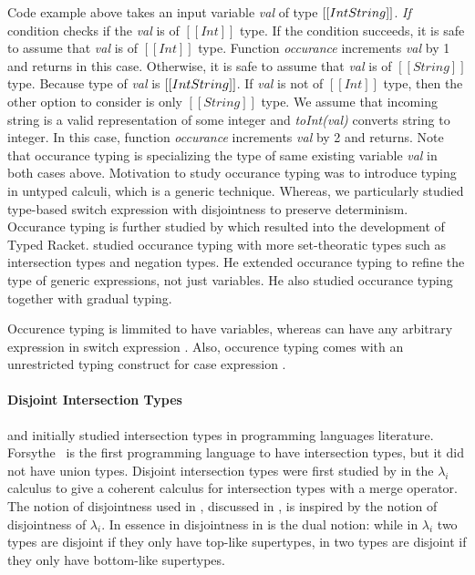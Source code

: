 \noindent Code example above takes an input variable \emph{val}
of type $[[Int \/ String]]$. 
\emph{If} condition checks if the \emph{val} is of $[[Int]]$ type.
If the condition succeeds, it is safe to assume that \emph{val} is of $[[Int]]$ type.
Function \emph{occurance} increments \emph{val} by 1 and returns in this case.
Otherwise, it is safe to assume that \emph{val} is of $[[String]]$ type.
Because type of \emph{val} is $[[Int \/ String]]$. If \emph{val} is not
of $[[Int]]$ type, then the other option to consider is only $[[String]]$ type.
We assume that incoming string is a valid representation of some integer
and \emph{toInt(val)} converts string to integer.
In this case, function \emph{occurance} increments \emph{val} by 2 and returns.
Note that occurance typing is specializing the type of
same existing variable \emph{val} in both cases above.
Motivation to study occurance typing was to introduce typing in untyped calculi,
which is a generic technique.
Whereas, we particularly studied type-based switch expression
with disjointness to preserve determinism.
Occurance typing is further studied by \cite{tobin2010logical}
which resulted into the development of Typed Racket.
\cite{castagna2019revisiting} studied occurance typing with more 
set-theoratic types such as intersection types and negation types.
He extended occurance typing to refine the type of
generic expressions, not just variables. He also studied occurance typing
together with gradual typing.


Occurence typing is limmited to have variables, whereas \cal
can have any arbitrary expression in switch expression
.
Also, occurence typing comes with an
unrestricted typing construct for case expression
.

\paragraph{Disjoint Intersection Types}
\citet{pottinger1980type} and \citet{coppo1981functional} initially
studied intersection types in programming languages
literature. Forsythe~\cite{reynolds1988preliminary} is the first 
programming language to have intersection types, but it did not
have union types.  Disjoint intersection types were first
studied by \citet{oliveira2016disjoint} in the $\lambda_{i}$ calculus
to give a coherent calculus for intersection types with a merge
operator. The notion of disjointness used in \cal, discussed in ,
is inspired by the notion of disjointness of $\lambda_{i}$. In essence in
disjointness in \cal is the dual notion: while in $\lambda_{i}$ two types
are disjoint if they only have top-like supertypes, in \cal two types
are disjoint if they only have bottom-like supertypes.

